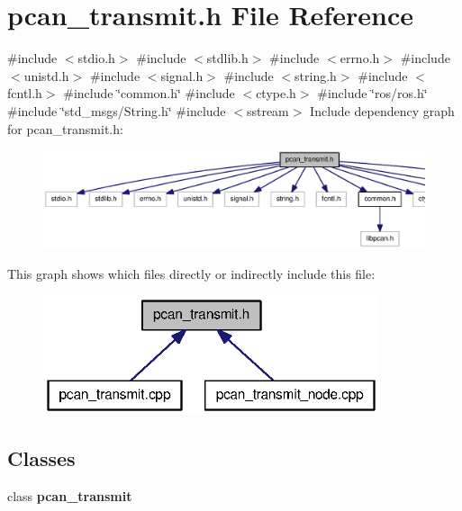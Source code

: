 \section{pcan\-\_\-transmit.\-h \-File \-Reference}
\label{pcan__transmit_8h}
{\ttfamily \#include $<$stdio.\-h$>$}\*
{\ttfamily \#include $<$stdlib.\-h$>$}\*
{\ttfamily \#include $<$errno.\-h$>$}\*
{\ttfamily \#include $<$unistd.\-h$>$}\*
{\ttfamily \#include $<$signal.\-h$>$}\*
{\ttfamily \#include $<$string.\-h$>$}\*
{\ttfamily \#include $<$fcntl.\-h$>$}\*
{\ttfamily \#include \char`\"{}common.\-h\char`\"{}}\*
{\ttfamily \#include $<$ctype.\-h$>$}\*
{\ttfamily \#include \char`\"{}ros/ros.\-h\char`\"{}}\*
{\ttfamily \#include \char`\"{}std\-\_\-msgs/\-String.\-h\char`\"{}}\*
{\ttfamily \#include $<$sstream$>$}\*
\-Include dependency graph for pcan\-\_\-transmit.\-h\-:\nopagebreak
\begin{figure}[H]
\begin{center}
\leavevmode
\includegraphics[width=350pt]{pcan__transmit_8h__incl}
\end{center}
\end{figure}
\-This graph shows which files directly or indirectly include this file\-:\nopagebreak
\begin{figure}[H]
\begin{center}
\leavevmode
\includegraphics[width=280pt]{pcan__transmit_8h__dep__incl}
\end{center}
\end{figure}
\subsection*{\-Classes}
\begin{DoxyCompactItemize}
\item 
class {\bf pcan\-\_\-transmit}
\end{DoxyCompactItemize}
